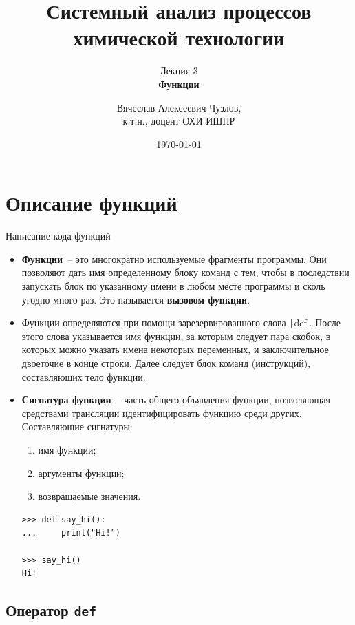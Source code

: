 \documentclass[aspectratio=169]{beamer}%
\title{\LARGE{Системный анализ процессов химической технологии}}
\subtitle{Лекция 3 \\ \textbf{Функции}}
\author[]{Вячеслав Алексеевич Чузлов, \\
к.т.н., доцент ОХИ ИШПР}
\date{\today}
\begin{document}

\titleframe%

\tocframe{}%



\section{Описание функций}
\sectionframe


\begin{frame}[fragile]{Написание кода функций}
\scriptsize
\begin{itemize}
\item \textcolor{extraorange}{\textbf{Функции}}~-- это многократно используемые фрагменты программы. Они позволяют дать имя определенному блоку команд с тем, чтобы в последствии запускать блок по указанному имени в любом месте программы и сколь угодно много раз. Это называется \textbf{вызовом функции}.
\item Функции определяются при помощи зарезервированного слова \texttt|def|. После этого слова указывается имя функции, за которым следует пара скобок, в которых можно указать имена некоторых переменных, и заключительное двоеточие в конце строки. Далее следует блок команд (инструкций), составляющих тело функции.

\item \textcolor{extraorange}{\textbf{Сигнатура функции}}~-- часть общего объявления функции, позволяющая средствами трансляции идентифицировать функцию среди других. Составляющие сигнатуры:
\begin{enumerate}
\scriptsize
\item имя функции;
\item аргументы функции;
\item возвращаемые значения.
\end{enumerate} 

\begin{verbatim}
>>> def say_hi():
...     print("Hi!")       

>>> say_hi()
Hi!
\end{verbatim}

\end{itemize}
\vfill
\end{frame}


\subsection{Оператор \texttt{def}}
\end{document}
